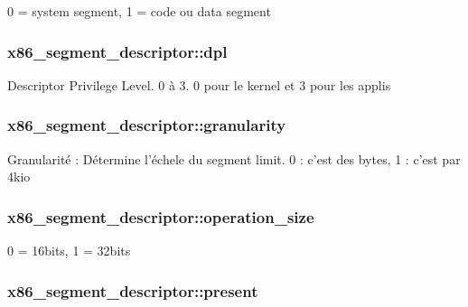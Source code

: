 0 = system segment, 1 = code ou data segment \hypertarget{structx86__segment__descriptor_ab45e49c27bbe57a568d914bd13e45ef7}{
\subsubsection[{dpl}]{ x86\-\_\-segment\-\_\-descriptor\-::dpl}}\label{structx86__segment__descriptor_ab45e49c27bbe57a568d914bd13e45ef7}
Descriptor Privilege Level. 0 à 3. 0 pour le kernel et 3 pour les applis \hypertarget{structx86__segment__descriptor_a19d5da93d41a1ec3327cbd92ace8fa08}{
\subsubsection[{granularity}]{ x86\-\_\-segment\-\_\-descriptor\-::granularity}}\label{structx86__segment__descriptor_a19d5da93d41a1ec3327cbd92ace8fa08}
Granularité \-: Détermine l'échele du segment limit. 0 \-: c'est des bytes, 1 \-: c'est par 4kio \hypertarget{structx86__segment__descriptor_a40c320788bf23e3660d0def872cec94c}{
\subsubsection[{operation\-\_\-size}]{ x86\-\_\-segment\-\_\-descriptor\-::operation\-\_\-size}}\label{structx86__segment__descriptor_a40c320788bf23e3660d0def872cec94c}
0 = 16bits, 1 = 32bits \hypertarget{structx86__segment__descriptor_ad4196191d05e69b42272a411a69d1eae}{
\subsubsection[{present}]{ x86\-\_\-segment\-\_\-descriptor\-::present}}\label{structx86__segment__descriptor_ad4196191d05e69b42272a411a69d1eae}
